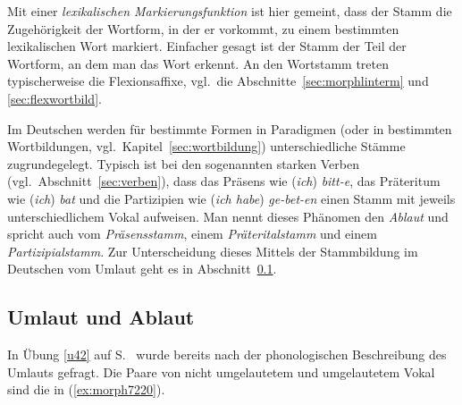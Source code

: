 

Mit einer \textit{lexikalischen Markierungsfunktion} ist hier gemeint, dass der Stamm die Zugehörigkeit der Wortform, in der er vorkommt, zu einem bestimmten lexikalischen Wort markiert.
Einfacher gesagt ist der Stamm der Teil der Wortform, an dem man das Wort erkennt.
An den Wortstamm treten typischerweise die Flexionsaffixe, vgl.\ die Abschnitte~\ref{sec:morphlinterm} und \ref{sec:flexwortbild}.

Im Deutschen werden für bestimmte Formen in Paradigmen (oder in bestimmten Wortbildungen, vgl.\ Kapitel~\ref{sec:wortbildung}) unterschiedliche Stämme zugrundegelegt.
Typisch ist \zB bei den sogenannten starken Verben (vgl.\ Abschnitt~\ref{sec:verben}), dass das Präsens wie (\textit{ich}) \textit{bitt-e}, das Präteritum wie (\textit{ich}) \textit{bat} und die Partizipien wie (\textit{ich habe}) \textit{ge-bet-en} einen Stamm mit jeweils unterschiedlichem Vokal aufweisen.
Man nennt dieses Phänomen den \textit{Ablaut} und spricht auch vom \textit{Präsensstamm}, einem \textit{Präteritalstamm} und einem \textit{Partizipialstamm}.
Zur Unterscheidung dieses Mittels der Stammbildung im Deutschen vom Umlaut geht es in Abschnitt~\ref{sec:umablaut}.

\subsection{Umlaut und Ablaut}

\label{sec:umablaut}

In Übung \ref{u42} auf S.~\pageref{u42} wurde bereits nach der phonologischen Beschreibung des Umlauts gefragt.
Die Paare von nicht umgelautetem und umgelautetem Vokal sind die in (\ref{ex:morph7220}).

\begin{exe}
  \ex\label{ex:morph7220}
  \begin{xlist}
  \end{xlist}
\end{exe}

